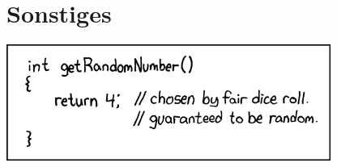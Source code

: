 \documentclass[]{papertex}
\begin{document}
	\section{Sonstiges}
		\label{sonstiges}
		\begin{center}
		\includegraphics[totalheight=3cm]{bilder/XKCD/random_number}
		\end{center}
		\begin{multicols}{2}
		
		\end{multicols}
		
		\begin{multicols}{2}
		
		\end{multicols}
		\newpage
		
\end{document}

